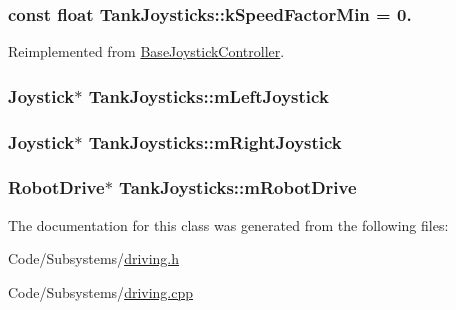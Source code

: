 \hypertarget{class_tank_joysticks_abdba3d773862b977177d157a99d48196}{
\subsubsection[{k\-Speed\-Factor\-Min}]{\setlength{\rightskip}{0pt plus 5cm}const float {\bf \-Tank\-Joysticks\-::k\-Speed\-Factor\-Min} = 0.}}\label{class_tank_joysticks_abdba3d773862b977177d157a99d48196}


\-Reimplemented from \hyperlink{class_base_joystick_controller_ae6950f7339ee1bc18437c6d1d364517f}{\-Base\-Joystick\-Controller}.

\hypertarget{class_tank_joysticks_a16401794f222fd934f5b86913a361a18}{
\subsubsection[{m\-Left\-Joystick}]{\setlength{\rightskip}{0pt plus 5cm}\-Joystick$\ast$ {\bf \-Tank\-Joysticks\-::m\-Left\-Joystick}}}\label{class_tank_joysticks_a16401794f222fd934f5b86913a361a18}
\hypertarget{class_tank_joysticks_ad393e41dbdcf3294e68336df1e85e56e}{
\subsubsection[{m\-Right\-Joystick}]{\setlength{\rightskip}{0pt plus 5cm}\-Joystick$\ast$ {\bf \-Tank\-Joysticks\-::m\-Right\-Joystick}}}\label{class_tank_joysticks_ad393e41dbdcf3294e68336df1e85e56e}
\hypertarget{class_tank_joysticks_a4536837c512d764f090bd7ea6b378a60}{
\subsubsection[{m\-Robot\-Drive}]{\setlength{\rightskip}{0pt plus 5cm}\-Robot\-Drive$\ast$ {\bf \-Tank\-Joysticks\-::m\-Robot\-Drive}}}\label{class_tank_joysticks_a4536837c512d764f090bd7ea6b378a60}


\-The documentation for this class was generated from the following files\-:\begin{DoxyCompactItemize}
\item 
\-Code/\-Subsystems/\hyperlink{driving_8h}{driving.\-h}\item 
\-Code/\-Subsystems/\hyperlink{driving_8cpp}{driving.\-cpp}\end{DoxyCompactItemize}

